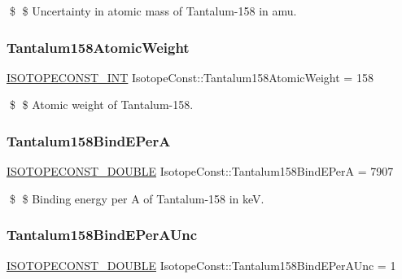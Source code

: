 \$ \$ Uncertainty in atomic mass of Tantalum-\/158 in amu. \mbox{\label{group___isotope_const-_tantalum-_ta158_ga0d3fa2b04c7063a4bc721956ffd1d7d0}} 
\subsubsection{\texorpdfstring{Tantalum158\+Atomic\+Weight}{Tantalum158AtomicWeight}}
{\footnotesize\ttfamily \mbox{\hyperlink{group___isotope_const-_macros_ga5f18360b3e99483a35c32d789e62621c}{I\+S\+O\+T\+O\+P\+E\+C\+O\+N\+S\+T\+\_\+\+I\+NT}} Isotope\+Const\+::\+Tantalum158\+Atomic\+Weight = 158}

\$ \$ Atomic weight of Tantalum-\/158. \mbox{\label{group___isotope_const-_tantalum-_ta158_ga3bfabb2caded6c91fd669559a16cc520}} 
\subsubsection{\texorpdfstring{Tantalum158\+Bind\+E\+PerA}{Tantalum158BindEPerA}}
{\footnotesize\ttfamily \mbox{\hyperlink{group___isotope_const-_macros_ga8f45a7272ce02c0b4c65c44636ed719a}{I\+S\+O\+T\+O\+P\+E\+C\+O\+N\+S\+T\+\_\+\+D\+O\+U\+B\+LE}} Isotope\+Const\+::\+Tantalum158\+Bind\+E\+PerA = 7907}

\$ \$ Binding energy per A of Tantalum-\/158 in keV. \mbox{\label{group___isotope_const-_tantalum-_ta158_ga2afd6a2b8303d79059981d2216fcca07}} 
\subsubsection{\texorpdfstring{Tantalum158\+Bind\+E\+Per\+A\+Unc}{Tantalum158BindEPerAUnc}}
{\footnotesize\ttfamily \mbox{\hyperlink{group___isotope_const-_macros_ga8f45a7272ce02c0b4c65c44636ed719a}{I\+S\+O\+T\+O\+P\+E\+C\+O\+N\+S\+T\+\_\+\+D\+O\+U\+B\+LE}} Isotope\+Const\+::\+Tantalum158\+Bind\+E\+Per\+A\+Unc = 1}

